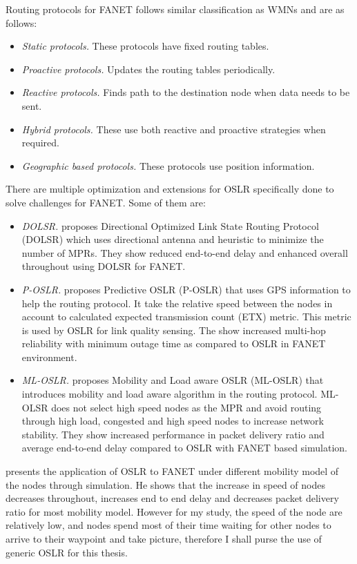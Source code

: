 Routing protocols for FANET follows similar classification as WMNs and are as follows:

\begin{itemize} 
	\item \textit{Static protocols.} These protocols have fixed routing tables.
	\item \textit{Proactive protocols.} Updates the routing tables periodically.
	\item \textit{Reactive protocols.} Finds path to the destination node when data needs to be sent.
	\item \textit{Hybrid protocols.}  These use both reactive and proactive strategies when required. 
	\item \textit{Geographic based protocols.} These protocols use position information.
\end{itemize}

There are multiple optimization and extensions for OSLR specifically done to solve challenges for FANET. Some of them are:

\begin{itemize}
	\item \textit{DOLSR.}  proposes Directional Optimized Link State Routing Protocol (DOLSR) which uses directional antenna and heuristic to minimize the number of MPRs. They show reduced end-to-end delay and enhanced overall throughout using DOLSR for FANET.
	\item \textit{P-OSLR.}  proposes Predictive OSLR (P-OSLR) that uses GPS information to help the routing protocol. It take the relative speed between the nodes in account to calculated expected transmission count (ETX) metric. This metric is used by OSLR for link quality sensing. The show increased multi-hop reliability with minimum outage time as compared to OSLR in FANET environment.
	\item \textit{ML-OSLR.}  proposes Mobility and Load aware OSLR (ML-OSLR) that introduces mobility and load aware algorithm in the routing protocol. ML-OLSR does not select high speed nodes as the MPR and avoid routing through high load, congested and high speed nodes to increase network stability. They show increased performance in packet delivery ratio and average end-to-end delay compared to OSLR with FANET based simulation.
\end{itemize}

 presents the application of OSLR to FANET under different mobility model of the nodes through simulation. He shows that the increase in speed of nodes decreases throughout, increases end to end delay and decreases packet delivery ratio for most mobility model. However for my study, the speed of the node are relatively low, and nodes spend most of their time waiting for other nodes to arrive to their waypoint and take picture, therefore I shall purse the use of generic OSLR for this thesis.


